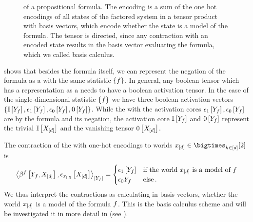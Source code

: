 \begin{figure}[t]
    \begin{center}
        
    \end{center}
    \caption{\BasisEncoding{} of a propositional formula.
    The encoding is a sum of the one hot encodings of all states of the factored system in a tensor product with basis vectors, which encode whether the state is a model of the formula.
    The tensor is directed, since any contraction with an encoded state results in the basis vector evaluating the formula, which we called basis calculus.
    }
    \label{fig:formulabencoding}
\end{figure}

 shows that besides the formula itself, we can represent the negation of the formula as a \ComputationActivationNetwork{} with the same statistic $\{f\}$.
In general, any boolean tensor which has a representation as a \ComputationActivationNetwork{} needs to have a boolean activation tensor.
In the case of the single-dimensional statistic $\{f\}$ we have three boolean activation vectors $\{\mathbb{I}\left[Y_{f}\right],\epsilon_{1}\left[Y_{f}\right],\epsilon_{0}\left[Y_{f}\right],0\left[Y_{f}\right]\}$.
While the \ComputationActivationNetworks{} with the activation cores $\epsilon_{1}\left[Y_{f}\right],\epsilon_{0}\left[Y_{f}\right]$ are by  the formula and its negation, the activation core $\mathbb{I}\left[Y_{f}\right]$ and $0\left[Y_{f}\right]$ represent the trivial $\mathbb{I}\left[X_{[d]}\right]$ and the vanishing tensor $0\left[X_{[d]}\right]$.

The contraction of the \basisEncoding{} with one-hot encodings to worlds $\shortcatindices\in\atomstates$ is
\begin{align*}
    \contractionof{\bencodingofat{\exformula}{\formulavar,\shortcatvariables},\onehotmapofat{\shortcatindices}{\shortcatvariables}}{\formulavar}
    = \begin{cases}
          \tbasisat{\formulavar} & \text{if the world $\shortcatindices$ is a model of $\exformula$}  \\
          \fbasis{\formulavar} & \text{else} \, .
    \end{cases}
\end{align*}
We thus interpret the contractions as calculating in basis vectors, whether the world $x_{[d]}$ is a model of the formula $f$.
This is the basis calculus scheme and will be investigated it in more detail in  (see ).


